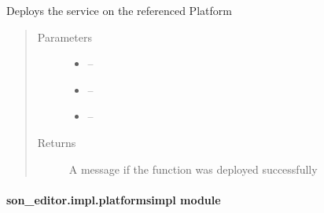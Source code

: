 \documentclass[letterpaper,10pt,english]{sphinxmanual}
\begin{document}
\begin{fulllineitems}
\label{_source/son_editor.impl:son_editor.impl.platform_connector.create_service_on_platform}
Deploys the service on the referenced Platform
\begin{quote}\begin{description}
\item[{Parameters}] \leavevmode\begin{itemize}
\item {} 
 -- 

\item {} 
 -- 

\item {} 
 -- 

\end{itemize}

\item[{Returns}] \leavevmode
A  message if the function was deployed successfully

\end{description}\end{quote}

\end{fulllineitems}


\begin{fulllineitems}
\label{_source/son_editor.impl:son_editor.impl.platform_connector.publish_referenced_functions}
\end{fulllineitems}



\paragraph{son\_editor.impl.platformsimpl module}
\label{_source/son_editor.impl:module-son_editor.impl.platformsimpl}\label{_source/son_editor.impl:son-editor-impl-platformsimpl-module}
\end{document}
